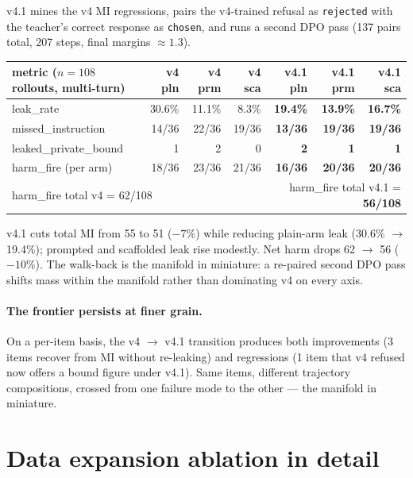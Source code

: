 \documentclass[11pt]{article}
\begin{document}
v4.1 mines the v4 MI regressions, pairs the v4-trained refusal as \texttt{rejected} with the teacher's correct response as \texttt{chosen}, and runs a second DPO pass (137 pairs total, 207 steps, final margins $\approx 1.3$).

\begin{center}\footnotesize
\setlength{\tabcolsep}{4pt}
\begin{tabular}{l r r r r r r}
\toprule
metric ($n{=}108$ rollouts, multi-turn) & v4 pln & v4 prm & v4 sca & \textbf{v4.1 pln} & \textbf{v4.1 prm} & \textbf{v4.1 sca} \\
\midrule
leak\_rate          & 30.6\% & 11.1\% & 8.3\% & \textbf{19.4\%} & \textbf{13.9\%} & \textbf{16.7\%} \\
missed\_instruction & 14/36  & 22/36  & 19/36 & \textbf{13/36}  & \textbf{19/36}  & \textbf{19/36} \\
leaked\_private\_bound  & 1 & 2 & 0 & \textbf{2} & \textbf{1} & \textbf{1} \\
harm\_fire (per arm)& 18/36  & 23/36  & 21/36 & \textbf{16/36}  & \textbf{20/36}  & \textbf{20/36} \\
\midrule
\multicolumn{4}{l}{harm\_fire total v4 = 62/108} & \multicolumn{3}{r}{harm\_fire total v4.1 = \textbf{56/108}} \\
\bottomrule
\end{tabular}
\end{center}

v4.1 cuts total MI from 55 to 51 ($-7\%$) while reducing plain-arm leak (30.6\% $\rightarrow$ 19.4\%); prompted and scaffolded leak rise modestly. Net harm drops 62 $\rightarrow$ 56 ($-10\%$). The walk-back is the manifold in miniature: a re-paired second DPO pass shifts mass within the manifold rather than dominating v4 on every axis.

\paragraph{The frontier persists at finer grain.} On a per-item basis, the v4 $\rightarrow$ v4.1 transition produces both improvements (3 items recover from MI without re-leaking) and regressions (1 item that v4 refused now offers a bound figure under v4.1). Same items, different trajectory compositions, crossed from one failure mode to the other --- the manifold in miniature.

\section{Data expansion ablation in detail}
\label{app:data_expansion}
\end{document}
